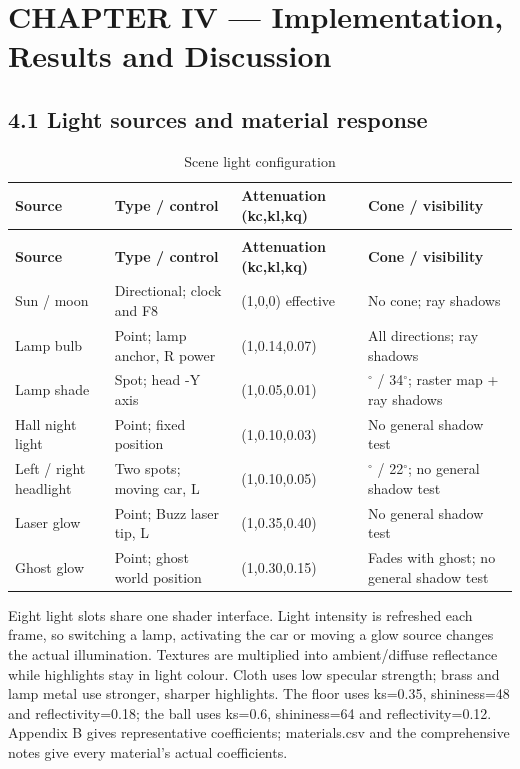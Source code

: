 \documentclass[12pt,a4paper]{article}
\begin{document}
\section*{CHAPTER IV --- Implementation, Results and Discussion}
\subsection*{4.1 Light sources and material response}
{\small\setlength{\tabcolsep}{4pt}\renewcommand{\arraystretch}{1.12}
\begin{longtable}{>{\raggedright\arraybackslash}p{}>{\raggedright\arraybackslash}p{}>{\raggedright\arraybackslash}p{}>{\raggedright\arraybackslash}p{}}
\caption{Scene light configuration}\label{tab:5}\\
\toprule
\textbf{Source} & \textbf{Type / control} & \textbf{Attenuation (kc,kl,kq)} & \textbf{Cone / visibility} \\\midrule
\endfirsthead
\multicolumn{4}{l}{\small\itshape Table \thetable{} (continued)}\\
\toprule
\textbf{Source} & \textbf{Type / control} & \textbf{Attenuation (kc,kl,kq)} & \textbf{Cone / visibility} \\\midrule
\endhead
\bottomrule\endfoot
Sun / moon & Directional; clock and F8 & (1,0,0) effective & No cone; ray shadows \\
Lamp bulb & Point; lamp anchor, R power & (1,0.14,0.07) & All directions; ray shadows \\
Lamp shade & Spot; head -Y axis & (1,0.05,0.01) & 22\(^{\circ}\) / 34\(^{\circ}\); raster map + ray shadows \\
Hall night light & Point; fixed position & (1,0.10,0.03) & No general shadow test \\
Left / right headlight & Two spots; moving car, L & (1,0.10,0.05) & 12\(^{\circ}\) / 22\(^{\circ}\); no general shadow test \\
Laser glow & Point; Buzz laser tip, L & (1,0.35,0.40) & No general shadow test \\
Ghost glow & Point; ghost world position & (1,0.30,0.15) & Fades with ghost; no general shadow test \\
\end{longtable}
}
Eight light slots share one shader interface. Light intensity is refreshed each frame, so switching a lamp, activating the car or moving a glow source changes the actual illumination. Textures are multiplied into ambient/diffuse reflectance while highlights stay in light colour. Cloth uses low specular strength; brass and lamp metal use stronger, sharper highlights. The floor uses ks=0.35, shininess=48 and reflectivity=0.18; the ball uses ks=0.6, shininess=64 and reflectivity=0.12. Appendix B gives representative coefficients; materials.csv and the comprehensive notes give every material's actual coefficients.
\end{document}
